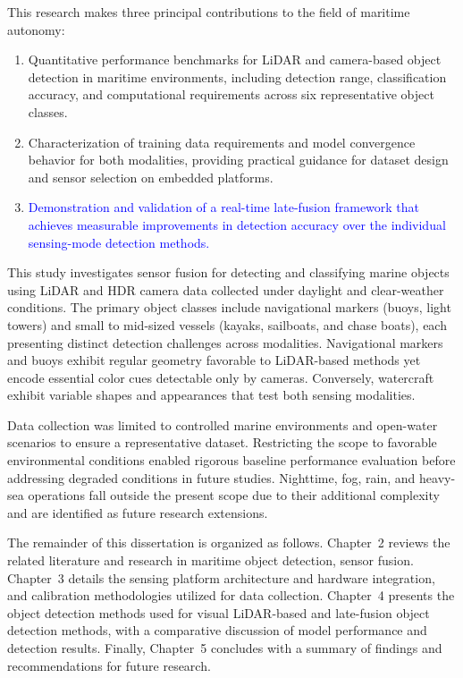 \documentclass[../main.tex]{subfiles}
\begin{document}
This research makes three principal contributions to the field of maritime autonomy:

\begin{enumerate}
    \item Quantitative performance benchmarks for \ac{LiDAR} and camera-based object detection in maritime environments, including detection range, classification accuracy, and computational requirements across six representative object classes.
    \item Characterization of training data requirements and model convergence behavior for both modalities, providing practical guidance for dataset design and sensor selection on embedded platforms.
    \item \textcolor{blue}{Demonstration and validation of a real-time late-fusion framework that achieves measurable improvements in detection accuracy over the individual sensing-mode detection methods.}
\end{enumerate}


This study investigates sensor fusion for detecting and classifying marine objects using \ac{LiDAR} and \ac{HDR} camera data collected under daylight and clear-weather conditions. The primary object classes include navigational markers (buoys, light towers) and small to mid-sized vessels (kayaks, sailboats, and chase boats), each presenting distinct detection challenges across modalities. Navigational markers and buoys exhibit regular geometry favorable to \ac{LiDAR}-based methods yet encode essential color cues detectable only by cameras. Conversely, watercraft exhibit variable shapes and appearances that test both sensing modalities.

Data collection was limited to controlled marine environments and open-water scenarios to ensure a representative dataset. Restricting the scope to favorable environmental conditions enabled rigorous baseline performance evaluation before addressing degraded conditions in future studies. Nighttime, fog, rain, and heavy-sea operations fall outside the present scope due to their additional complexity and are identified as future research extensions.

The remainder of this dissertation is organized as follows.  
Chapter~2 reviews the related literature and research in maritime object detection, sensor fusion. 
Chapter~3 details the sensing platform architecture and hardware integration, and calibration methodologies utilized for data collection.  
Chapter~4 presents the object detection methods used for visual LiDAR-based and late-fusion object detection methods, with a comparative discussion of model performance and detection results.  
Finally, Chapter~5 concludes with a summary of findings and recommendations for future research.
\end{document}
